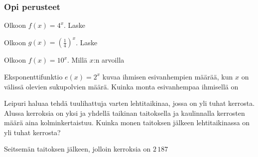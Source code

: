 \begin{tehtavasivu}

\subsubsection*{Opi perusteet}

\begin{tehtava}
Olkoon $f(x) = 4^x$. Laske
\begin{vastaus}
\end{vastaus}
\end{tehtava}

\begin{tehtava}
Olkoon $g(x) = (\frac{1}{4})^x$. Laske
\begin{vastaus}
\end{vastaus}
\end{tehtava}

\begin{tehtava}
Olkoon $f(x) = 10^x$. Millä $x$:n arvoilla
\begin{vastaus}
\end{vastaus}
\end{tehtava}

\begin{tehtava}
Eksponenttifunktio $ e(x)=2^{x}$ kuvaa ihmisen esivanhempien määrää, kun $ x $ on välissä olevien sukupolvien määrä. Kuinka monta esivanhempaa ihmisellä on
\begin{vastaus}
\end{vastaus}
\end{tehtava}

\begin{tehtava}
Leipuri haluaa tehdä tuulihattuja varten lehtitaikinaa, jossa on yli tuhat kerrosta. Alussa kerroksia on yksi ja yhdellä taikinan taitoksella ja kaulinnalla kerrosten määrä aina kolminkertaistuu. Kuinka monen taitoksen jälkeen lehtitaikinassa on yli tuhat kerrosta?
\begin{vastaus}
Seitsemän taitoksen jälkeen, jolloin kerroksia on $2\,187$
\end{vastaus}
\end{tehtava}


\end{tehtavasivu}
